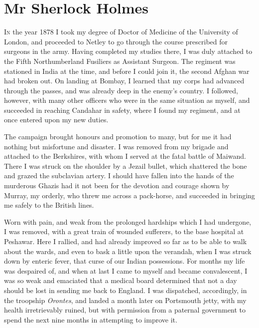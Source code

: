 \chapter{Mr Sherlock Holmes}
	\lettrine{I}{n} the year 1878 I took my degree of Doctor of Medicine of the University of London, and proceeded to Netley to go through the course prescribed for surgeons in the army. Having completed my studies there, I was duly attached to the Fifth Northumberland Fusiliers as Assistant Surgeon. The regiment was stationed in India at the time, and before I could join it, the second Afghan war had broken out. On landing at Bombay, I learned that my corps had advanced through the passes, and was already deep in the enemy's country. I followed, however, with many other officers who were in the same situation as myself, and succeeded in reaching Candahar in safety, where I found my regiment, and at once entered upon my new duties.

The campaign brought honours and promotion to many, but for me it had nothing but misfortune and disaster. I was removed from my brigade and attached to the Berkshires, with whom I served at the fatal battle of Maiwand. There I was struck on the shoulder by a Jezail bullet, which shattered the bone and grazed the subclavian artery. I should have fallen into the hands of the murderous Ghazis had it not been for the devotion and courage shown by Murray, my orderly, who threw me across a pack-horse, and succeeded in bringing me safely to the British lines.

Worn with pain, and weak from the prolonged hardships which I had undergone, I was removed, with a great train of wounded sufferers, to the base hospital at Peshawar. Here I rallied, and had already improved so far as to be able to walk about the wards, and even to bask a little upon the verandah, when I was struck down by enteric fever, that curse of our Indian possessions. For months my life was despaired of, and when at last I came to myself and became convalescent, I was so weak and emaciated that a medical board determined that not a day should be lost in sending me back to England. I was dispatched, accordingly, in the troopship \textit{Orontes}, and landed a month later on Portsmouth jetty, with my health irretrievably ruined, but with permission from a paternal government to spend the next nine months in attempting to improve it.

